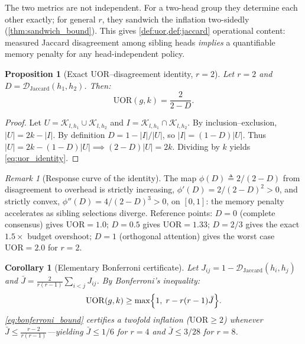 \documentclass[final,5p,times,twocolumn]{elsarticle}
\newtheorem{corollary}{Corollary}
\newtheorem{proposition}{Proposition}
\theoremstyle{definition}
\theoremstyle{remark}
\newtheorem{remark}{Remark}
\newcommand{\UOR}{\mathrm{UOR}}
\newcommand{\TokSet}[1]{\mathcal{K}_{l,#1}}
\begin{document}
The two metrics are not independent. For a two-head group they determine
each other exactly; for general $r$, they sandwich the inflation
two-sidedly (\cref{thm:sandwich_bound}). This gives
\cref{def:uor,def:jaccard} operational content: measured Jaccard
disagreement among sibling heads \emph{implies} a quantifiable memory
penalty for any head-independent policy.

\begin{proposition}[Exact UOR--disagreement identity, $r = 2$]
\label{prop:uorjaccard}
Let $r = 2$ and
 $D = \mathcal{D}_{\mathrm{Jaccard}}(h_1, h_2)$. Then:
\begin{equation}
\UOR(g, k) = \frac{2}{2 - D}.
\label{eq:uor_identity}
\end{equation}
\end{proposition}

\begin{proof}
Let $U = \TokSet{h_1} \cup \TokSet{h_2}$ and
 $I = \TokSet{h_1} \cap \TokSet{h_2}$. By inclusion--exclusion,
 $|U| = 2k - |I|$. By definition $D = 1 - |I|/|U|$, so
 $|I| = (1-D)|U|$. Thus
 $|U| = 2k - (1-D)|U| \implies (2-D)|U| = 2k$. Dividing by $k$ yields
\cref{eq:uor_identity}.
\end{proof}

\begin{remark}[Response curve of the identity]
\label{rem:phi}
The map $\phi(D) \triangleq 2/(2-D)$ from disagreement to overhead is
strictly increasing, $\phi'(D) = 2/(2-D)^2 > 0$, and strictly convex,
 $\phi''(D) = 4/(2-D)^3 > 0$, on $[0,1]$: the memory penalty accelerates
as sibling selections diverge. Reference points: $D = 0$ (complete
consensus) gives $\UOR = 1.0$; $D = 0.5$ gives $\UOR = 1.33$; $D = 2/3$ gives the exact $1.5\times$ budget overshoot; $D = 1$ (orthogonal
attention) gives the worst case $\UOR = 2.0$ for $r = 2$.
\end{remark}

\begin{corollary}[Elementary Bonferroni certificate]
\label{cor:bonferroni}
Let $J_{ij} = 1 - \mathcal{D}_{\mathrm{Jaccard}}(h_i, h_j)$ and
 $\bar{J} = \frac{2}{r(r-1)} \sum_{i < j} J_{ij}$. By Bonferroni's
inequality:
\begin{equation}
\UOR(g, k) \ge \max\Bigl\{ 1, \; r - r(r-1)\bar{J} \Bigr\}.
\label{eq:bonferroni_bound}
\end{equation}
\cref{eq:bonferroni_bound} certifies a twofold inflation
($\UOR \ge 2$) whenever $\bar{J} \le \frac{r-2}{r(r-1)}$---yielding
 $\bar{J} \le 1/6$ for $r=4$ and $\bar{J} \le 3/28$ for $r=8$.
\end{corollary}
\end{document}
